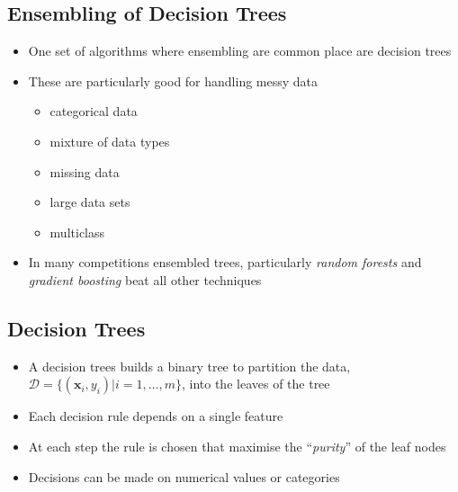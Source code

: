 
\begin{slide}
\section{Ensembling of Decision Trees}

\begin{PauseHighLight}
  \begin{itemize}
  \item One set of algorithms where ensembling are common place are
    decision trees\pause
  \item These are particularly good for handling messy data
    \begin{itemize}
    \item categorical data\pause
    \item mixture of data types\pause
    \item missing data\pause
    \item large data sets\pause
    \item multiclass\pause
    \end{itemize}
  \item In many competitions ensembled trees, particularly
    \textit{random forests} and \textit{gradient boosting} beat all
    other techniques\pause
  \end{itemize}
\end{PauseHighLight}

\end{slide}


\begin{slide}
\section{Decision Trees}

\begin{PauseHighLight}
  \begin{itemize}
  \item A decision trees builds a binary tree to partition the data,
    $\mathcal{D}=\{(\bm{x}_i, y_i)|i=1,\ldots,m\}$, into the leaves of
    the tree\pause
  \item Each decision rule depends on a single feature\pause
  \item At each step the rule is chosen that maximise the
    ``\textit{purity}'' of the leaf nodes\pause
  \item Decisions can be made on numerical values or categories\pause
  \end{itemize}
\end{PauseHighLight}

\end{slide}

